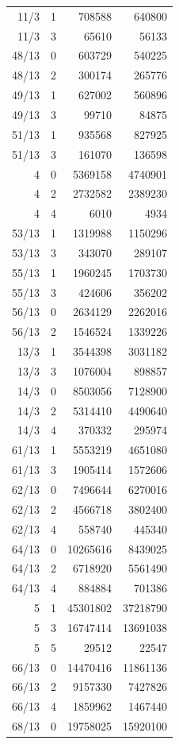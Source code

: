 \begin{longtable}{@{}rrrr@{}}
11/3 & 1 & 708588 & 640800\\
11/3 & 3 & 65610 & 56133\\
48/13 & 0 & 603729 & 540225\\
48/13 & 2 & 300174 & 265776\\
49/13 & 1 & 627002 & 560896\\
49/13 & 3 & 99710 & 84875\\
51/13 & 1 & 935568 & 827925\\
51/13 & 3 & 161070 & 136598\\
4 & 0 & 5369158 & 4740901\\
4 & 2 & 2732582 & 2389230\\
4 & 4 & 6010 & 4934\\
53/13 & 1 & 1319988 & 1150296\\
53/13 & 3 & 343070 & 289107\\
55/13 & 1 & 1960245 & 1703730\\
55/13 & 3 & 424606 & 356202\\
56/13 & 0 & 2634129 & 2262016\\
56/13 & 2 & 1546524 & 1339226\\
13/3 & 1 & 3544398 & 3031182\\
13/3 & 3 & 1076004 & 898857\\
14/3 & 0 & 8503056 & 7128900\\
14/3 & 2 & 5314410 & 4490640\\
14/3 & 4 & 370332 & 295974\\
61/13 & 1 & 5553219 & 4651080\\
61/13 & 3 & 1905414 & 1572606\\
62/13 & 0 & 7496644 & 6270016\\
62/13 & 2 & 4566718 & 3802400\\
62/13 & 4 & 558740 & 445340\\
64/13 & 0 & 10265616 & 8439025\\
64/13 & 2 & 6718920 & 5561490\\
64/13 & 4 & 884884 & 701386\\
5 & 1 & 45301802 & 37218790\\
5 & 3 & 16747414 & 13691038\\
5 & 5 & 29512 & 22547\\
66/13 & 0 & 14470416 & 11861136\\
66/13 & 2 & 9157330 & 7427826\\
66/13 & 4 & 1859962 & 1467440\\
68/13 & 0 & 19758025 & 15920100\\

\end{longtable}
